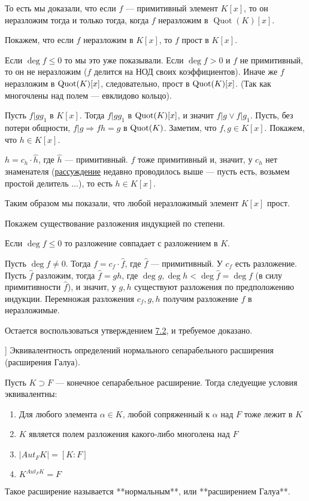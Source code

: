 То есть мы доказали, что если \(f\) --- примитивный элемент \(K[x]\), то он неразложим тогда и только тогда, когда \(f\) неразложим в \(\operatorname{Quot}(K)[x]\).

Покажем, что если \(f\) неразложим в \(K[x]\), то \(f\) прост в \(K[x]\).

Если \(\deg f \leqslant 0\) то мы это уже показывали. Если \(\deg f > 0\) и \(f\) не примитивный, то он не неразложим (\(f\) делится на НОД своих коэффициентов). Иначе же \(f\) неразложим в \(\operatorname{Quot}(K)[x]\), следовательно, прост в \(\operatorname{Quot}(K)[x]\). (Так как многочлены над полем --- евклидово кольцо).

Пусть \(f | gg_1\) в \(K[x]\). Тогда \(f | gg_1\) в \(\operatorname{Quot}(K)[x]\), и значит \(f | g \lor f | g_1\). Пусть, без потери общности, \(f | g \Rightarrow fh = g\) в \(\operatorname{Quot}(K)\). Заметим, что \(f, g \in K[x]\). Покажем, что \(h \in K[x]\).

\(h = c_h \cdot \hat{h}\), где \(\hat{h}\) --- примитивный. \(f\) тоже примитивный и, значит, у \(c_h\) нет знаменателя (\hyperlink{9.3.no.denominator}{рассуждение} недавно проводилось выше --- пусть есть, возьмем простой делитель \(\ldots\)), то есть \(h \in K[x]\).

Таким образом мы показали, что любой неразложимый элемент \(K[x]\) прост.

Покажем существование разложения индукцией по степени.

Если \(\deg f \leqslant 0\) то разложение совпадает с разложением в \(K\).

Пусть \(\deg f \ne 0\). Тогда \(f = c_f \cdot \hat{f}\), где \(\hat{f}\) --- примитивный. У \(c_f\) есть разложение. Пусть \(\hat{f}\) разложим, тогда \(\hat{f} = gh\), где \(\deg g, \deg h < \deg \hat{f} = \deg f\) (в силу примитивности \(\hat{f}\)), и значит, у \(g, h\) существуют разложения по предположению индукции. Перемножая разложения \(c_f, g, h\) получим разложение \(f\) в неразложимые.

Остается воспользоваться утверждением \hyperlink{7.2}{7.2}, и требуемое доказано.

\begin{problem}[7 [Каргальцев]]
Эквивалентность определений нормального сепарабельного расширения (расширения Галуа).

Пусть $K \supset F$ --- конечное сепарабельное расширение.
Тогда следуещие условия эквивалентны:

\begin{enumerate}
    \item Для любого элемента $\alpha \in K$, любой сопряженный к $\alpha$ над $F$ тоже лежит в $K$
    \item $K$ является полем разложения какого-либо многолена над $F$
    \item $|Aut_FK| = [K : F]$
    \item $K^{Aut_FK} = F$
\end{enumerate}

Такое расширение называется **нормальным**, или **расширением Галуа**.

\end{problem}

